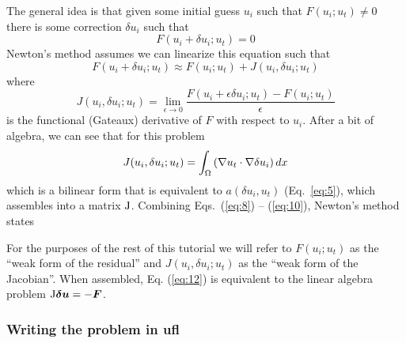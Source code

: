The general idea is that given some initial guess $u_{i}$ such that
$F(u_{i}; u_{t}) \neq 0$ there is some correction $\delta u_{i}$ such
that
\begin{equation}
  \label{eq:8}
  F(u_{i} + \delta u_{i}; u_{t}) = 0
\end{equation}
Newton's method assumes we can linearize this equation such that
\begin{equation}
  \label{eq:9}
   F(u_{i} + \delta u_{i}; u_{t}) \approx F(u_{i};u_{t}) +
   J(u_{i},\delta u_{i}; u_{t})
\end{equation}
where 
\begin{equation}
  \label{eq:10}
  J(u_{i},\delta u_{i}; u_{t}) = \lim_{\epsilon\rightarrow 0}
  \frac{F(u_{i}+\epsilon\delta u_{i};u_{t}) - F(u_{i};u_{t})}{\epsilon}
\end{equation}
is the functional (Gateaux) derivative of $F$ with respect to
$u_{i}$.  After a bit of algebra, we can see that for this problem
\begin{equation}
  \label{eq:11}
  J(u_{i},\delta u_{i}; u_{t}) = \int_{\Omega} \left(
    \nabla u_{t}\cdot\nabla \delta u_{i} \right)dx
\end{equation}
which is a bilinear form that is equivalent to $a(\delta u_{i},u_{t})$
(Eq.\ \ref{eq:5}), which assembles into a matrix $\mathrm{J}$. Combining Eqs.\
(\ref{eq:8}) -- (\ref{eq:10}), Newton's method
states
\begin{quote}
\end{quote}
For the purposes of the rest of this tutorial we will refer to
$F(u_{i};u_{t})$ as the ``weak form of the residual'' and
$J(u_{i},\delta u_{i};u_{t})$ as the ``weak form of the
Jacobian''.  When assembled, Eq. (\ref{eq:12}) is equivalent to the
linear algebra problem $\mathrm{J}{\mbox{\boldmath$\delta u$}} = -{\mbox{\boldmath$F$}}$.

\subsubsection{Writing the problem in ufl}
\label{sec:writing-problem-ufl}

